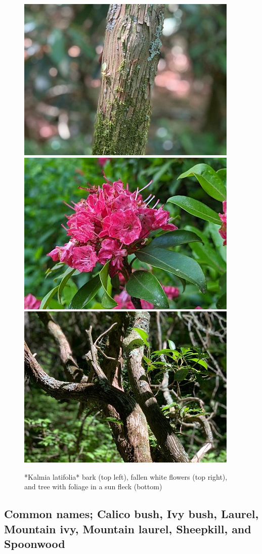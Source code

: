 \documentclass[
]{article}
\begin{document}
\begin{figure}

{\centering \includegraphics[width=0.5\linewidth]{kalmia1} \includegraphics[width=0.5\linewidth]{kalmlat} \includegraphics[width=0.5\linewidth]{kallat} 

}

\caption{*Kalmia latifolia* bark (top left), fallen white flowers (top right), and tree with foliage in a sun fleck (bottom)}\label{fig:kalmia}
\end{figure}

\hypertarget{common-names-calico-bush-ivy-bush-laurel-mountain-ivy-mountain-laurel-sheepkill-and-spoonwood}{%
\subsection{Common names; Calico bush, Ivy bush, Laurel, Mountain ivy, Mountain laurel, Sheepkill, and Spoonwood}\label{common-names-calico-bush-ivy-bush-laurel-mountain-ivy-mountain-laurel-sheepkill-and-spoonwood}}
\end{document}
